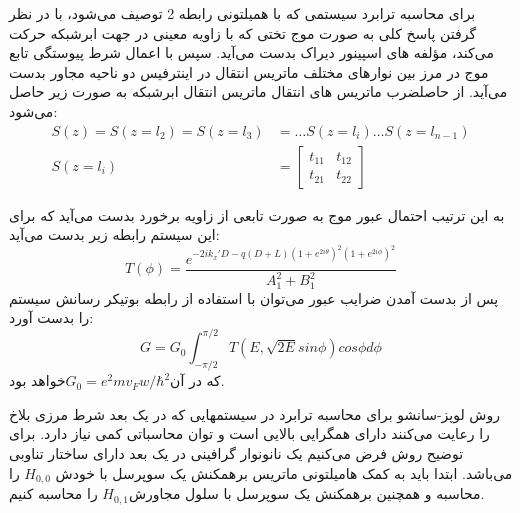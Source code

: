 برای محاسبه ترابرد سیستمی که با همیلتونی رابطه 2 توصیف می‌شود، با در نظر گرفتن پاسخ کلی به صورت موج تختی که با زاویه معینی در جهت ابرشبکه حرکت می‌کند، مؤلفه های اسپینور دیراک بدست می‌آید. سپس با اعمال شرط پیوستگی تابع موج در مرز بین نوارهای مختلف ماتریس انتقال در اینترفیس دو ناحیه مجاور بدست می‌آید. از حاصلضرب ماتریس های انتقال ماتریس انتقال ابرشبکه به صورت زیر حاصل می‌شود:
\begin{equation}
    \begin{split}
    S(z) = S(z=l_{2}) = S(z=l_{3}) &= \dots S(z=l_{i})       \dots S(z=l_{n-1})\\
    S(z=l_{i}) &= 
        \begin{bmatrix} 
            t_{11} & t_{12} \\
            t_{21} & t_{22}
        \end{bmatrix}
    \end{split}
\end{equation}

به این ترتیب احتمال عبور موج به صورت تابعی از زاویه برخورد بدست می‌آید که برای این سیستم رابطه زیر بدست می‌آید:
\begin{equation}
    T(\phi) = \frac{e^{-2ik_x\prime D-q(D+L)(1+e^{2i\theta})^2(1+e^{2i\phi})^2}}{A_1^2 + B_1^2}
\end{equation}
پس از  بدست آمدن ضرایب عبور می‌توان با استفاده از رابطه بوتیکر رسانش سیستم را بدست آورد:
\begin{equation}
    G = G_0 \int_{-\pi/2}^{\pi/2} T(E,\sqrt{2E} sin\phi)cos\phi d\phi
\end{equation}
که در آن$G_0 = e^2m v_F w/\hbar^2$خواهد بود.

روش لوپز-سانشو برای محاسبه ترابرد در سیستمهایی که در یک بعد شرط مرزی بلاخ را رعایت می‌کنند دارای همگرایی بالایی است و توان محاسباتی کمی نیاز دارد. برای توضیح روش فرض می‌کنیم یک نانونوار گرافینی در یک بعد دارای ساختار تناوبی می‌باشد. ابتدا باید به کمک هامیلتونی  ماتریس برهمکنش یک سوپرسل با خودش $H_{0,0}$ را محاسبه و همچنین برهمکنش یک سوپرسل با سلول مجاورش$H_{0,1}$ را محاسبه کنیم.


